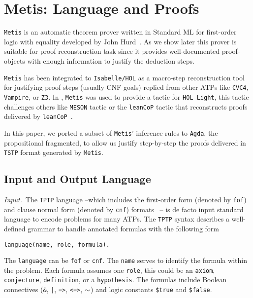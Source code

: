 \documentclass[../main.tex]{subfiles}
\begin{document}

\section{Metis: Language and Proofs}
\label{sec:metis-language-and-proofs}

\verb!Metis! is an automatic theorem prover written in Standard ML for
first-order logic with equality developed by John Hurd~\cite{hurd2003first}.
As we show later this prover is suitable for proof reconstruction task since
it provides well-documented proof-objects with enough information to justify
the deduction steps.

\verb!Metis! has been integrated to \verb!Isabelle/HOL! as a macro-step reconstruction
tool for justifying proof steps (usually CNF goals) replied from other ATPs like
\verb!CVC4!, \verb!Vampire!, or \verb!Z3!.
In \cite{Farber2015}, \verb!Metis! was used to provide a tactic for
\verb!HOL Light!, this tactic challenges others like \verb!MESON! tactic or the
\verb!leanCoP! tactic that reconstructs proofs delivered by
\verb!leanCoP!~\cite{Farber2016}.

In this paper, we ported a subset of \verb!Metis!' inference rules to \verb!Agda!,
the propositional fragmented, to allow us justify step-by-step the proofs
delivered in \verb!TSTP! format generated by \verb!Metis!.


\subsection{Input and Output Language}
\label{ssec:input-and-output-language}

\textit{Input.}~The \verb!TPTP! language  --which includes the first-order
form (denoted by \verb!fof!) and clause normal form (denoted by \verb!cnf!)
formats~\cite{sutcliffe2009} -- is de
facto input standard language to encode problems for many ATPs.
The \verb!TPTP! syntax describes a well-defined grammar to handle annotated
formulas with the following form

\begin{verbatim}
language(name, role, formula).
\end{verbatim}

The \verb!language! can be \verb!fof! or \verb!cnf!. The \verb!name!
serves to identify the formula within the problem. Each formula assumes one
\verb!role!, this could be an \verb!axiom!, \verb!conjecture!,
\verb!definition!, or a \verb!hypothesis!. The formulas include Boolean
connectives (\verb!&!, \verb!|!, \verb!=>!, \verb!<=>!, $\tt\sim$) and logic
constants \verb!$true! and \verb!$false!.
\end{document}
